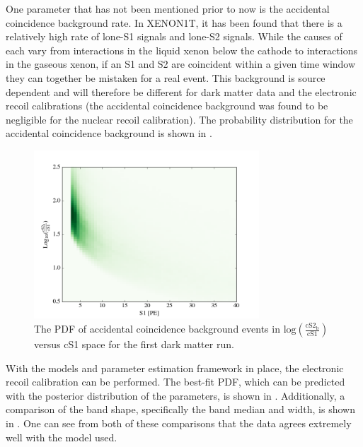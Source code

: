 One parameter that has not been mentioned prior to now is the accidental coincidence background rate.  In XENON1T, it has been found that there is a relatively high rate of lone-S1 signals and lone-S2 signals.  While the causes of each vary from interactions in the liquid xenon below the cathode to interactions in the gaseous xenon, if an S1 and S2 are coincident within a given time window they can together be mistaken for a real event.  This background is source dependent and will therefore be different for dark matter data and the electronic recoil calibrations (the accidental coincidence background was found to be negligible for the nuclear recoil calibration).  The probability distribution for the accidental coincidence background is shown in .

\begin{figure}[t]
	\centering
	\includegraphics[width=0.75\textwidth]{xe1t_ac_bkg}
	\caption{The PDF of accidental coincidence background events in $\textrm{log} \left( \frac{\textrm{cS2}_{\textrm{b}}}{\textrm{cS1}} \right)$ versus cS1 space for the first dark matter run.}
	\label{fig:xe1t_ac_bkg}
\end{figure}



With the models and parameter estimation framework in place, the electronic recoil calibration can be performed.  The best-fit PDF, which can be predicted with the posterior distribution of the parameters, is shown in .  Additionally, a comparison of the band shape, specifically the band median and width, is shown in .  One can see from both of these comparisons that the  data agrees extremely well with the model used.


